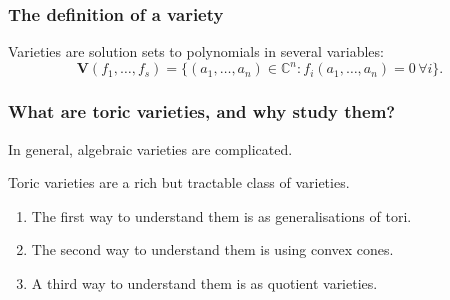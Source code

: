 \documentclass{beamer}
\theoremstyle{definition}
\theoremstyle{definition}
\begin{document}
\begin{frame}[t]
\frametitle{The definition of a variety}
\begin{block}{}
Varieties are solution sets to polynomials in several variables: $$\mathbf{V}(f_1, \ldots, f_s) = \{(a_1, \ldots, a_n) \in \mathbb{C}^n : f_i(a_1, \ldots, a_n)=0 \, \forall i\}.$$
\end{block}




\end{frame}

\begin{frame}
\frametitle{What are toric varieties, and why study them?}
In general, algebraic varieties are complicated.

Toric varieties are a rich but tractable class of varieties.
\begin{enumerate}
\item[\textbullet] The \alert{first} way to understand them is as \alert{generalisations of tori}.
\item[\textbullet] The \alert{second} way to understand them is using \alert{convex cones}. 
\item[\textbullet] A \alert{third} way to understand them is as \alert{quotient varieties}.
\end{enumerate}
\end{frame}
\end{document}

